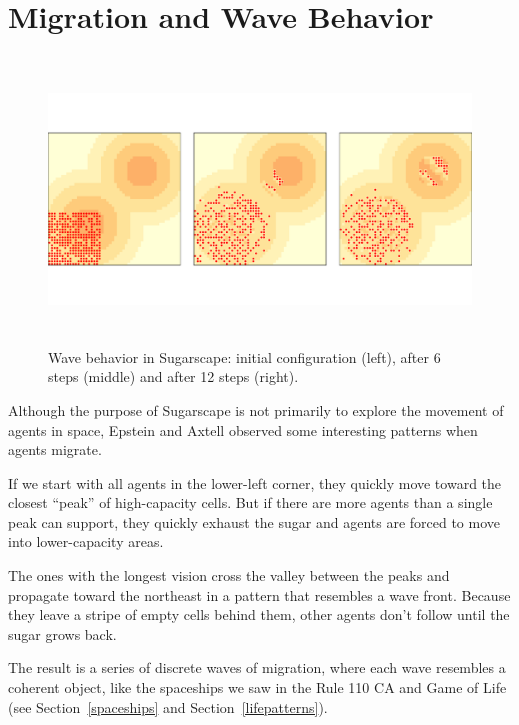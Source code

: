 \documentclass[12pt]{book}
\theoremstyle{exercise}
\begin{document}


\section{Migration and Wave Behavior}

\begin{figure}
\centerline{\includegraphics[height=3in]{figs/chap09-5.pdf}}
\caption{Wave behavior in Sugarscape: initial configuration (left),
after 6 steps (middle) and after 12 steps (right). }
\label{chap09-5}
\end{figure}

Although the purpose of Sugarscape is not primarily to explore the
movement of agents in space, Epstein and Axtell observed some
interesting patterns when agents migrate.


If we start with all agents in the lower-left corner, they quickly move
toward the closest ``peak'' of high-capacity cells.  But if there
are more agents than a single peak can support, they quickly exhaust
the sugar and agents are forced to move into lower-capacity areas.

The ones with the longest vision cross the valley between the
peaks and propagate toward the northeast in a pattern that
resembles a wave front.  Because they leave a stripe of empty cells
behind them, other agents don't follow until the sugar grows back.


The result is a series of discrete waves of migration, where each wave
resembles a coherent object, like the spaceships we saw in the Rule
110 CA and Game of Life (see Section~\ref{spaceships} and
Section~\ref{lifepatterns}).
\end{document}

